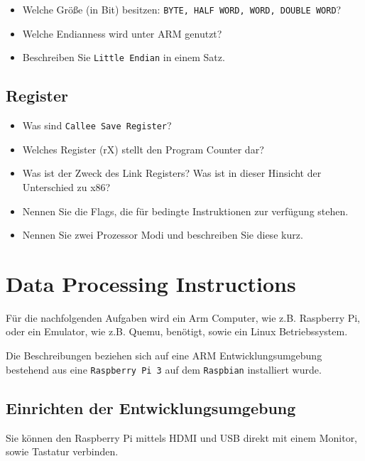 \documentclass[12pt]{article}
\begin{document}
\begin{itemize}
    \item Welche Größe (in Bit) besitzen: \texttt{BYTE, HALF WORD, WORD, DOUBLE WORD}?
    \item Welche Endianness wird unter ARM genutzt?
    \item Beschreiben Sie \texttt{Little Endian} in einem Satz.
\end{itemize}

\subsection{Register}

\begin{itemize}
    \item Was sind \texttt{Callee Save Register}?
    \item Welches Register (rX) stellt den Program Counter dar?
    \item Was ist der Zweck des Link Registers? Was ist in dieser Hinsicht der
        Unterschied zu x86?
    \item Nennen Sie die Flags, die für bedingte Instruktionen zur verfügung stehen.
    \item Nennen Sie zwei Prozessor Modi und beschreiben Sie diese kurz.
\end{itemize}

\section{Data Processing Instructions}
Für die nachfolgenden Aufgaben wird ein Arm Computer, wie z.B. Raspberry Pi,
oder ein Emulator, wie z.B. Quemu, benötigt, sowie ein Linux Betriebssystem.

Die Beschreibungen beziehen sich auf eine ARM Entwicklungsumgebung
bestehend aus eine \texttt{Raspberry Pi 3} auf dem \texttt{Raspbian} installiert
wurde.

\subsection{Einrichten der Entwicklungsumgebung}
Sie können den Raspberry Pi mittels HDMI und USB direkt mit einem Monitor, sowie
Tastatur verbinden. 
\end{document}
